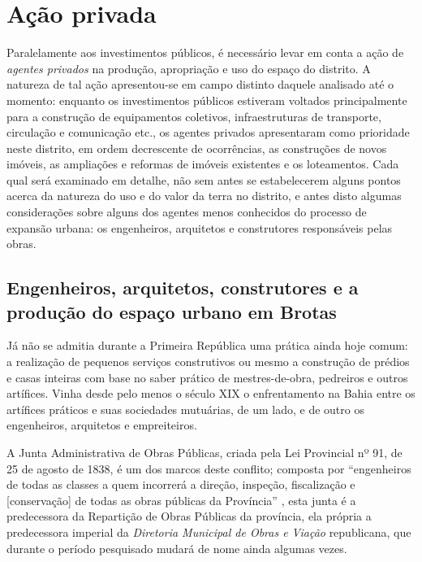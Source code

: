 \section{Ação privada}\label{sec:acaoprivada}

Paralelamente aos investimentos públicos, é necessário levar em conta a ação de \textit{agentes privados} na produção, apropriação e uso do espaço do distrito. A natureza de tal ação apresentou-se em campo distinto daquele analisado até o momento: enquanto os investimentos públicos estiveram voltados principalmente para a construção de equipamentos coletivos, infraestruturas de transporte, circulação e comunicação etc., os agentes privados apresentaram como prioridade neste distrito, em ordem decrescente de ocorrências, as construções de novos imóveis, as ampliações e reformas de imóveis existentes e os loteamentos. Cada qual será examinado em detalhe, não sem antes se estabelecerem alguns pontos acerca da natureza do uso e do valor da terra no distrito, e antes disto algumas considerações sobre alguns dos agentes menos conhecidos do processo de expansão urbana: os engenheiros, arquitetos e construtores responsáveis pelas obras.

\subsection{Engenheiros, arquitetos, construtores e a produção do espaço urbano em Brotas}\label{subsec:gestprodespbrotas}

Já não se admitia durante a Primeira República uma prática ainda hoje comum: a realização de pequenos serviços construtivos ou mesmo a construção de prédios e casas inteiras com base no saber prático de mestres-de-obra, pedreiros e outros artífices. Vinha desde pelo menos o século XIX o enfrentamento na Bahia entre os artífices práticos e suas sociedades mutuárias, de um lado, e de outro os engenheiros, arquitetos e empreiteiros. 

A Junta Administrativa de Obras Públicas, criada pela Lei Provincial nº 91, de 25 de agosto de 1838, é um dos marcos deste conflito; composta por ``engenheiros de todas as classes a quem incorrerá a direção, inspeção, fiscalização e [conservação] de todas as obras públicas da Província'' \cite[pp.~244-245]{REIS2012}, esta junta é a predecessora da Repartição de Obras Públicas da província, ela própria a predecessora imperial da \textit{Diretoria Municipal de Obras e Viação} republicana, que durante o período pesquisado mudará de nome ainda algumas vezes.

